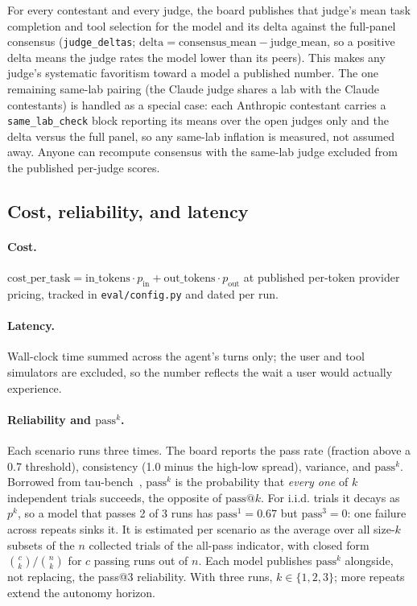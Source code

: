 For every contestant and every judge, the board publishes that judge's mean task
completion and tool selection for the model and its delta against the full-panel
consensus (\texttt{judge\_deltas}; $\text{delta} = \text{consensus\_mean} -
\text{judge\_mean}$, so a positive delta means the judge rates the model lower than
its peers). This makes any judge's systematic favoritism toward a model a published
number. The one remaining same-lab pairing (the Claude judge shares a lab with the
Claude contestants) is handled as a special case: each Anthropic contestant carries
a \texttt{same\_lab\_check} block reporting its means over the open judges only and
the delta versus the full panel, so any same-lab inflation is measured, not
assumed away. Anyone can recompute consensus with the same-lab judge excluded from
the published per-judge scores.

\subsection{Cost, reliability, and latency}

\paragraph{Cost.} $\text{cost\_per\_task} = \text{in\_tokens} \cdot p_{\text{in}} +
\text{out\_tokens} \cdot p_{\text{out}}$ at published per-token provider pricing,
tracked in \texttt{eval/config.py} and dated per run.

\paragraph{Latency.} Wall-clock time summed across the agent's turns only; the user
and tool simulators are excluded, so the number reflects the wait a user would
actually experience.

\paragraph{Reliability and $\text{pass}^k$.} Each scenario runs three times. The
board reports the pass rate (fraction above a 0.7 threshold), consistency (1.0
minus the high-low spread), variance, and $\text{pass}^k$. Borrowed from
tau-bench~\cite{taubench2024}, $\text{pass}^k$ is the probability that \emph{every
one} of $k$ independent trials succeeds, the opposite of $\text{pass}@k$. For
i.i.d. trials it decays as $p^k$, so a model that passes 2 of 3 runs has
$\text{pass}^1 = 0.67$ but $\text{pass}^3 = 0$: one failure across repeats sinks
it. It is estimated per scenario as the average over all size-$k$ subsets of the
$n$ collected trials of the all-pass indicator, with closed form
$\binom{c}{k}/\binom{n}{k}$ for $c$ passing runs out of $n$. Each model publishes
$\text{pass}^k$ alongside, not replacing, the pass@3 reliability. With three runs,
$k \in \{1,2,3\}$; more repeats extend the autonomy horizon.

